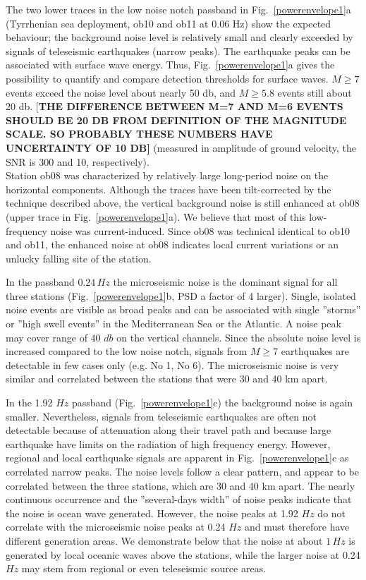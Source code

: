 \documentclass{article}
\providecommand{\remark}[1]{{[\bf #1]}}
\begin{document}
{The two lower traces in the low noise notch passband 
in Fig.~\ref{powerenvelope1}a (Tyrrhenian sea deployment, 
ob10 and ob11 at $0.06$ Hz)
show the expected behaviour; 
the background noise level is relatively small and clearly exceeded
by signals of teleseismic earthquakes (narrow peaks). 
The earthquake peaks can be associated with surface wave energy.
Thus,  Fig.~\ref{powerenvelope1}a gives 
the possibility to quantify and compare detection 
thresholds for surface waves. 
$M \geq 7$ events exceed the noise level about nearly 50 db, 
and 
$M \geq 5.8$ events still about 20 db. \remark{THE DIFFERENCE BETWEEN
M=7 AND M=6 EVENTS SHOULD BE 20 DB FROM DEFINITION OF THE MAGNITUDE
SCALE.  SO PROBABLY THESE NUMBERS HAVE UNCERTAINTY OF 10 DB}
(measured in amplitude of ground velocity, the SNR is 
300 and 10, respectively). 
\\
Station ob08
was characterized by relatively large long-period noise on the 
horizontal components. 
Although the traces have been tilt-corrected by the technique described 
above, the vertical background noise is still enhanced at ob08
(upper trace in Fig.~\ref{powerenvelope1}a).
We believe that most of this low-frequency noise was current-induced.
Since ob08 was 
technical identical to ob10 and ob11, 
the enhanced noise at ob08 
indicates local current variations 
or an unlucky falling site of the station.

In the passband $0.24\, Hz$  
the microseismic noise is the 
dominant signal for all three stations
(Fig.~\ref{powerenvelope1}b, 
PSD a factor of 4 larger). 
Single, isolated noise events are visible as broad peaks and can be associated 
with single ''storms'' or ''high swell events'' in the 
Mediterranean Sea or the Atlantic.
A noise peak may cover range of 40 $db$ on the vertical channels.
Since the absolute noise level is increased compared to the low noise notch, 
signals from $M \geq 7$ earthquakes are detectable in few cases
only (e.g. No 1, No 6).
The microseismic noise is very similar and  
correlated between the stations that were 30 and 
40 km apart.


In the 1.92 $Hz$ passband  
(Fig.~\ref{powerenvelope1}c)
the background noise is again smaller.
Nevertheless,
signals from teleseismic earthquakes are 
often not detectable because of attenuation
along their travel path 
and because
large earthquake have 
limits on the radiation of high frequency energy.
However, regional and local earthquake signals are apparent 
in Fig.~\ref{powerenvelope1}c as correlated narrow peaks.
The noise levels follow a clear 
pattern,
and appear to be correlated between the three stations, which are 30 and 40 km apart.
The nearly continuous occurrence and the ''several-days width'' 
of noise peaks indicate that the noise
is ocean wave generated. 
However, the noise peaks at 1.92 $Hz$ do not correlate with the 
microseismic noise peaks 
at 0.24 $Hz$ and must therefore have different generation areas.
We demonstrate below that the noise at about $1\, Hz$ 
is generated by local oceanic waves above the stations, 
while the larger noise at 
0.24 $Hz$ may stem from regional or even teleseismic source areas.

}
\end{document}
